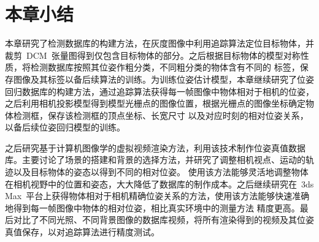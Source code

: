 \section{本章小结}
\label{sec:summary}
本章研究了检测数据库的构建方法，在灰度图像中利用追踪算法定位目标物体，并裁剪~DCM~张量图得到仅包含目标物体的部分。之后根据目标物体的模型对称性质，将检测数据库按照其位姿作粗分类，不同粗分类的物体含有不同的
标签，保存图像及其标签以备后续算法的训练。为训练位姿估计模型，本章继续研究了位姿回归数据库的构建方法，通过追踪算法获得每一帧图像中物体相对于相机的位姿，之后利用相机投影模型得到模型光栅点的图像位置，根据光栅点的图像坐标确定物体检测框，保存该检测框的顶点坐标、长宽尺寸
以及对应时刻的相对位姿关系，以备后续位姿回归模型的训练。

之后研究基于计算机图像学的虚拟视频渲染方法，利用该技术制作位姿真值数据库。主要讨论了场景的搭建和背景的选择方法，并研究了调整相机视点、运动的轨迹以及目标物体的姿态以得到不同的相对位姿。
使用该方法能够灵活地调整物体在相机视野中的位置和姿态，大大降低了数据库的制作成本。之后继续研究在~3ds Max~平台上获得物体相对于相机精确位姿关系的方法，使用该方法能够快速准确地得到每一帧图像中物体的相对位姿，相比真实环境中的测量方法
精度更高。最后对比了不同光照、不同背景图像的数据库视频，将所有渲染得到的视频及其位姿真值保存，以对追踪算法进行精度测试。